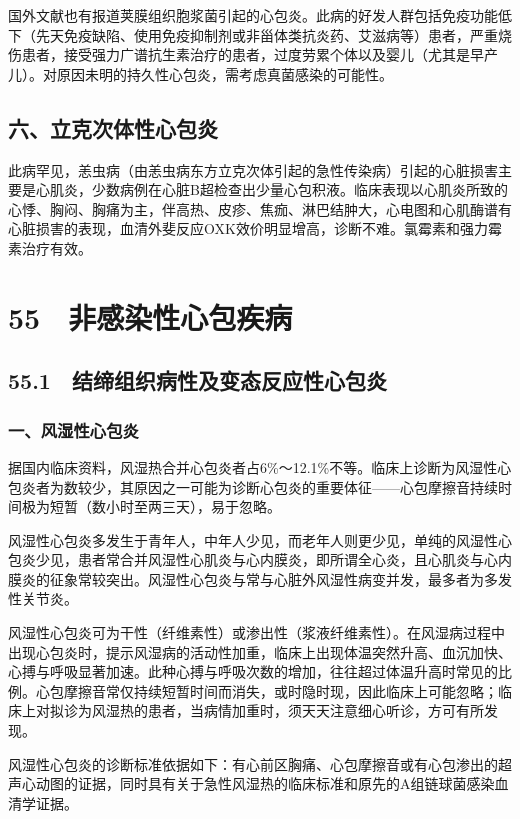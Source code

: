 国外文献也有报道荚膜组织胞浆菌引起的心包炎。此病的好发人群包括免疫功能低下（先天免疫缺陷、使用免疫抑制剂或非甾体类抗炎药、艾滋病等）患者，严重烧伤患者，接受强力广谱抗生素治疗的患者，过度劳累个体以及婴儿（尤其是早产儿）。对原因未明的持久性心包炎，需考虑真菌感染的可能性。

\subsection{六、立克次体性心包炎}

此病罕见，恙虫病（由恙虫病东方立克次体引起的急性传染病）引起的心脏损害主要是心肌炎，少数病例在心脏B超检查出少量心包积液。临床表现以心肌炎所致的心悸、胸闷、胸痛为主，伴高热、皮疹、焦痂、淋巴结肿大，心电图和心肌酶谱有心脏损害的表现，血清外斐反应OXK效价明显增高，诊断不难。氯霉素和强力霉素治疗有效。

\protect\hypertarget{text00146.html}{}{}

\section{55　非感染性心包疾病}

\subsection{55.1　结缔组织病性及变态反应性心包炎}

\subsubsection{一、风湿性心包炎}

据国内临床资料，风湿热合并心包炎者占6\%～12.1\%不等。临床上诊断为风湿性心包炎者为数较少，其原因之一可能为诊断心包炎的重要体征------心包摩擦音持续时间极为短暂（数小时至两三天），易于忽略。

风湿性心包炎多发生于青年人，中年人少见，而老年人则更少见，单纯的风湿性心包炎少见，患者常合并风湿性心肌炎与心内膜炎，即所谓全心炎，且心肌炎与心内膜炎的征象常较突出。风湿性心包炎与常与心脏外风湿性病变并发，最多者为多发性关节炎。

风湿性心包炎可为干性（纤维素性）或渗出性（浆液纤维素性）。在风湿病过程中出现心包炎时，提示风湿病的活动性加重，临床上出现体温突然升高、血沉加快、心搏与呼吸显著加速。此种心搏与呼吸次数的增加，往往超过体温升高时常见的比例。心包摩擦音常仅持续短暂时间而消失，或时隐时现，因此临床上可能忽略；临床上对拟诊为风湿热的患者，当病情加重时，须天天注意细心听诊，方可有所发现。

风湿性心包炎的诊断标准依据如下：有心前区胸痛、心包摩擦音或有心包渗出的超声心动图的证据，同时具有关于急性风湿热的临床标准和原先的A组链球菌感染血清学证据。


